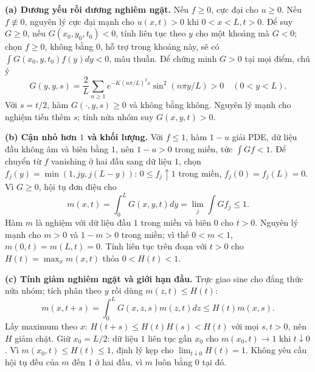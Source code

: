 \documentclass[10pt,a4paper]{article}
\begin{document}
\textbf{(a) Dương yếu rồi dương nghiêm ngặt.}
Nếu $f\ge0$, cực đại cho $u\ge0$. Nếu $f\not\equiv0$, nguyên lý cực đại mạnh cho $u(x,t)>0$ khi $0<x<L,t>0$. Để suy $G\ge0$, nếu $G(x_0,y_0,t_0)<0$, tính liên tục theo $y$ cho một khoảng mà $G<0$; chọn $f\ge0$, không bằng $0$, hỗ trợ trong khoảng này, sẽ có $\int G(x_0,y,t_0)f(y)dy<0$, mâu thuẫn. Để chứng minh $G>0$ tại mọi điểm, chú ý
\[G(y,y,s)=\frac2L\sum_{n\ge1}e^{-K(n\pi/L)^2s}\sin^2(n\pi y/L)>0\quad(0<y<L).\]
Với $s=t/2$, hàm $G(\cdot,y,s)\ge0$ và không bằng không. Nguyên lý mạnh cho nghiệm tiến thêm $s$; tính nửa nhóm suy $G(x,y,t)>0$.

\textbf{(b) Cận nhỏ hơn $1$ và khối lượng.}
Với $f\le1$, hàm $1-u$ giải PDE, dữ liệu đầu không âm và biên bằng $1$, nên $1-u>0$ trong miền, tức $\int Gf<1$. Để chuyển từ $f$ vanishing ở hai đầu sang dữ liệu $1$, chọn $f_j(y)=\min(1,jy,j(L-y))$: $0\le f_j\uparrow1$ trong miền, $f_j(0)=f_j(L)=0$. Vì $G\ge0$, hội tụ đơn điệu cho
\[m(x,t)=\int_0^LG(x,y,t)dy=\lim_j\int Gf_j\le1.\]
Hàm $m$ là nghiệm với dữ liệu đầu $1$ trong miền và biên $0$ cho $t>0$. Nguyên lý mạnh cho $m>0$ và $1-m>0$ trong miền; vì thế $0<m<1$, $m(0,t)=m(L,t)=0$. Tính liên tục trên đoạn với $t>0$ cho $H(t)=\max_xm(x,t)$ thỏa $0<H(t)<1$.

\textbf{(c) Tính giảm nghiêm ngặt và giới hạn đầu.}
Trực giao sine cho đẳng thức nửa nhóm; tích phân theo $y$ rồi dùng $m(z,t)\le H(t)$:
\[m(x,t+s)=\int_0^LG(x,z,s)m(z,t)dz\le H(t)m(x,s).\]
Lấy maximum theo $x$: $H(t+s)\le H(t)H(s)<H(t)$ với mọi $s,t>0$, nên $H$ giảm chặt. Giữ $x_0=L/2$: dữ liệu $1$ liên tục gần $x_0$ cho $m(x_0,t)\to1$ khi $t\downarrow0$. Vì $m(x_0,t)\le H(t)\le1$, định lý kẹp cho $\lim_{t\downarrow0}H(t)=1$. Không yêu cầu hội tụ đều của $m$ đến $1$ ở hai đầu, vì $m$ luôn bằng $0$ tại đó.
\end{document}
